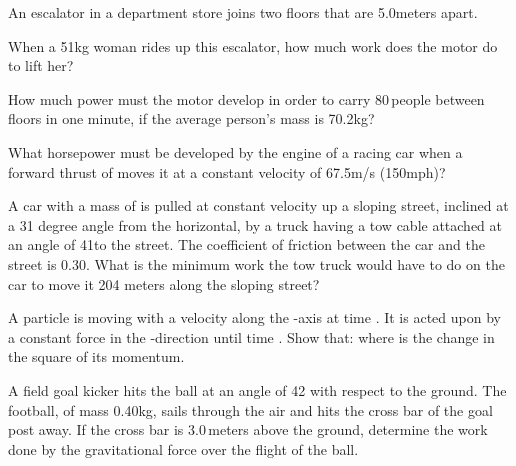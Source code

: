 {\begin{two-digit-list}
\item [5.] An escalator in a department store joins two floors that are 5.0\unit{meters} apart.
\begin{one-digit-list}
\item [a.] When a 51\unit{kg} woman rides up this escalator, how much work does
the motor do to lift her?  
\item [b.] How much power must the motor develop in order to carry 80\,\unit{people}
between floors in one minute, if the average person's mass is 70.2\unit{kg}? 
\end{one-digit-list}

\item [6.] What horsepower must be developed by the engine of a racing car when
a forward thrust of  moves it at a constant velocity of
67.5\unit{m/s} (150\unit{mph})?  

\item [7.] A car with a mass of  is pulled at constant
velocity up a sloping street, inclined at a 31 degree angle from the horizontal,
by a truck having a tow cable attached at an angle of 41\degrees to the street.
The coefficient of friction between the car and the street is 0.30.
What is the minimum work the tow truck would have to do on the car to move
it 204 meters along the sloping street?  

\item [8.] 

\item [9.] A particle is moving with a velocity  along the -axis at
time .
It is acted upon by a constant force in the -direction until time .
Show that:
%
%
%
where  is the change in the square of its momentum. 

\item [10.] A field goal kicker hits the ball at an angle of {42\degrees}
with respect to the ground.
The football, of mass 0.40\unit{kg}, sails through the air and hits the cross bar
of the goal post  away.
If the cross bar is 3.0\,\unit{meters} above the ground, determine the work done by
the gravitational force over the flight of the ball.  


\end{two-digit-list}}
